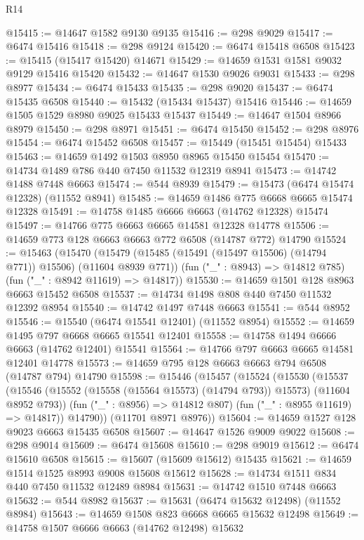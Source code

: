 \begin{lexlean}{R14}
\begin{coremodule}
{{{{{{{{{{{{{{{{{{{{{{{{{{{{{{{{{{{{{{{{{{{{{{{{{{{{{{{{{{{{{{{{{{{{{{{{{{{{{{{{{{@15415 := @14647 @1582 @9130 @9135
@15416 := @298 @9029
@15417 := @6474 @15416
@15418 := @298 @9124
@15420 := @6474 @15418 @6508
@15423 := @15415 (@15417 @15420) @14671
@15429 := @14659 @1531 @1581 @9032 @9129 @15416 @15420
@15432 := @14647 @1530 @9026 @9031
@15433 := @298 @8977
@15434 := @6474 @15433
@15435 := @298 @9020
@15437 := @6474 @15435 @6508
@15440 := @15432 (@15434 @15437) @15416
@15446 := @14659 @1505 @1529 @8980 @9025 @15433 @15437
@15449 := @14647 @1504 @8966 @8979
@15450 := @298 @8971
@15451 := @6474 @15450
@15452 := @298 @8976
@15454 := @6474 @15452 @6508
@15457 := @15449 (@15451 @15454) @15433
@15463 := @14659 @1492 @1503 @8950 @8965 @15450 @15454
@15470 := @14734 @1489 @786 @440 @7450 @11532 @12319 @8941
@15473 := @14742 @1488 @7448 @6663
@15474 := @544 @8939
@15479 := @15473 (@6474 @15474 @12328) (@11552 @8941)
@15485 := @14659 @1486 @775 @6668 @6665 @15474 @12328
@15491 := @14758 @1485 @6666 @6663 (@14762 @12328) @15474
@15497 := @14766 @775 @6663 @6665 @14581 @12328 @14778
@15506 := @14659 @773 @128 @6663 @6663 @772 @6508 (@14787 @772) @14790
@15524 := @15463
    (@15470
      (@15479 (@15485 (@15491 (@15497 @15506) (@14794 @771)) @15506) (@11604 @8939 @771))
      (fun ("_" : @8943) => @14812 @785)
      (fun ("_" : @8942 @11619) => @14817))
@15530 := @14659 @1501 @128 @8963 @6663 @15452 @6508
@15537 := @14734 @1498 @808 @440 @7450 @11532 @12392 @8954
@15540 := @14742 @1497 @7448 @6663
@15541 := @544 @8952
@15546 := @15540 (@6474 @15541 @12401) (@11552 @8954)
@15552 := @14659 @1495 @797 @6668 @6665 @15541 @12401
@15558 := @14758 @1494 @6666 @6663 (@14762 @12401) @15541
@15564 := @14766 @797 @6663 @6665 @14581 @12401 @14778
@15573 := @14659 @795 @128 @6663 @6663 @794 @6508 (@14787 @794) @14790
@15598 := @15446
    (@15457
      (@15524
        (@15530
          (@15537
            (@15546 (@15552 (@15558 (@15564 @15573) (@14794 @793)) @15573) (@11604 @8952 @793))
            (fun ("_" : @8956) => @14812 @807)
            (fun ("_" : @8955 @11619) => @14817))
          @14790))
      (@11701 @8971 @8976))
@15604 := @14659 @1527 @128 @9023 @6663 @15435 @6508
@15607 := @14647 @1526 @9009 @9022
@15608 := @298 @9014
@15609 := @6474 @15608
@15610 := @298 @9019
@15612 := @6474 @15610 @6508
@15615 := @15607 (@15609 @15612) @15435
@15621 := @14659 @1514 @1525 @8993 @9008 @15608 @15612
@15628 := @14734 @1511 @834 @440 @7450 @11532 @12489 @8984
@15631 := @14742 @1510 @7448 @6663
@15632 := @544 @8982
@15637 := @15631 (@6474 @15632 @12498) (@11552 @8984)
@15643 := @14659 @1508 @823 @6668 @6665 @15632 @12498
@15649 := @14758 @1507 @6666 @6663 (@14762 @12498) @15632
}}}}}}}}}}}}}}}}}}}}}}}}}}}}}}}}}}}}}}}}}}}}}}}}}}}}}}}}}}}}}}}}}}}}}}}}}}}}}}}}}}
\end{coremodule}
\end{lexlean}
